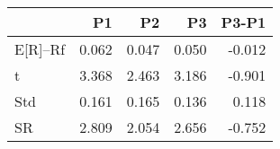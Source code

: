 \begin{tabular}{lrrrr}
\toprule
 & P1 & P2 & P3 & P3-P1 \\
\midrule
E[R]--Rf & 0.062 & 0.047 & 0.050 & -0.012 \\
t & 3.368 & 2.463 & 3.186 & -0.901 \\
Std & 0.161 & 0.165 & 0.136 & 0.118 \\
SR & 2.809 & 2.054 & 2.656 & -0.752 \\
\bottomrule
\end{tabular}
